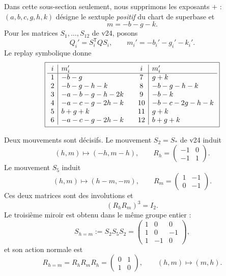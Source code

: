 \documentclass[11pt,a4paper]{article}
\begin{document}
Dans cette sous-section seulement, nous supprimons les exposants $+$ : $(a,b,c,g,h,k)$ désigne le sextuple \emph{positif} du chart de superbase et
\[
 m=-b-g-k.
\]
Pour les matrices $S_1,\ldots,S_{12}$ de v24, posons
\[
 Q_i'=S_i^{\mathsf T}QS_i,
 \qquad
 m_i'=-b_i'-g_i'-k_i'.
\]
Le replay symbolique donne
\begin{equation}\label{eq:v26-m-twelve-table}
\boxed{
\begin{array}{c|l@{\qquad}c|l}
i&m_i'&i&m_i'\\
\hline
1&-b-g&
7&g+k\\
2&-b-g-h-k&
8&-b-g-h-k\\
3&-a-b-g-h-2k&
9&-b-k\\
4&-a-c-g-2h-k&
10&-b-c-2g-h-k\\
5&b+g+k&
11&g+k\\
6&-a-c-g-2h-k&
12&b+g+k
\end{array}}
\end{equation}

Deux mouvements sont décisifs. Le mouvement $S_2=S_*$ de v24 induit
\begin{equation}\label{eq:v26-Rh}
 \boxed{
 (h,m)\longmapsto(-h,m-h),
 \qquad
 R_h=
 \begin{pmatrix}
 -1&0\\
 -1&1
 \end{pmatrix}.}
\end{equation}
Le mouvement $S_5$ induit
\begin{equation}\label{eq:v26-Rm}
 \boxed{
 (h,m)\longmapsto(h-m,-m),
 \qquad
 R_m=
 \begin{pmatrix}
 1&-1\\
 0&-1
 \end{pmatrix}.}
\end{equation}
Ces deux matrices sont des involutions et
\[
 (R_hR_m)^3=I_2.
\]
Le troisième miroir est obtenu dans le même groupe entier :
\begin{equation}\label{eq:v26-Rhm}
 S_{h=m}:=S_2S_5S_2
 =
 \begin{pmatrix}
 1&0&0\\
 1&0&-1\\
 1&-1&0
 \end{pmatrix},
\end{equation}
et son action normale est
\[
 \boxed{
 R_{h=m}=R_hR_mR_h
 =
 \begin{pmatrix}0&1\\1&0\end{pmatrix},
 \qquad
 (h,m)\longmapsto(m,h).}
\]
\end{document}
